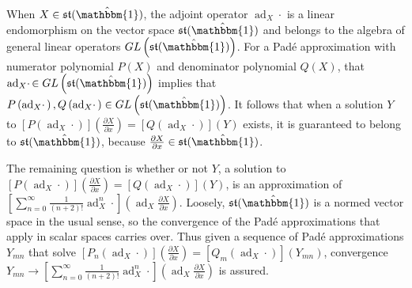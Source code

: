 When $X \in \mathfrak{st}(\hat{\mathbbm{1}})$, the adjoint operator $\operatorname{ad}_X \cdotp$
is a linear endomorphism on the vector space $\mathfrak{st}(\hat{\mathbbm{1}})$ and belongs 
to the algebra of general linear operators $GL\left(\mathfrak{st}(\hat{\mathbbm{1}})\right)$. 
For a Pad\'{e} approximation with numerator polynomial $P\left(X\right)$ and denominator 
polynomial $Q\left(X\right)$, that $\operatorname{ad}_X \cdotp \in GL\left(\mathfrak{st}(\hat{\mathbbm{1}})\right)$
implies that $P\left(\operatorname{ad}_X \cdotp\right), Q\left(\operatorname{ad}_X \cdotp\right) \in GL\left(\mathfrak{st}(\hat{\mathbbm{1}})\right)$.
It follows that when a solution $Y$ to $\left[P\left(\operatorname{ad}_X \cdotp\right)\right] \left(\frac{\partial X}{\partial x}\right) = \left[Q\left(\operatorname{ad}_X \cdotp\right)\right] \left(Y\right) $
exists, it is guaranteed to belong to $\mathfrak{st}(\hat{\mathbbm{1}})$, because $\frac{\partial X}{\partial x} \in \mathfrak{st}(\hat{\mathbbm{1}})$.

The remaining question is whether or not $Y$, a solution to $\left[P\left(\operatorname{ad}_X \cdotp\right)\right] \left(\frac{\partial X}{\partial x}\right) = \left[Q\left(\operatorname{ad}_X \cdotp\right)\right] \left(Y\right) $,
is an approximation of $\left[\sum_{n=0}^{\infty} \frac{1}{\left(n+2\right)!} \operatorname{ad}_X^n \cdotp \right] \left(\operatorname{ad}_X \frac{\partial X}{\partial x} \right)$.
Loosely, $\mathfrak{st}(\hat{\mathbbm{1}})$ is a normed vector space in the usual sense, so 
the convergence of the Pad\'{e} approximations that apply in scalar spaces carries over. 
Thus given a sequence of Pad\'{e} approximations $Y_{mn}$ that solve $\left[P_n\left(\operatorname{ad}_X \cdotp\right)\right] \left(\frac{\partial X}{\partial x}\right) = \left[Q_m\left(\operatorname{ad}_X \cdotp\right)\right] \left(Y_{mn}\right) $,
convergence $Y_{mn} \rightarrow \left[\sum_{n=0}^{\infty} \frac{1}{\left(n+2\right)!} \operatorname{ad}_X^n \cdotp \right] \left(\operatorname{ad}_X \frac{\partial X}{\partial x} \right)$
is assured. 

